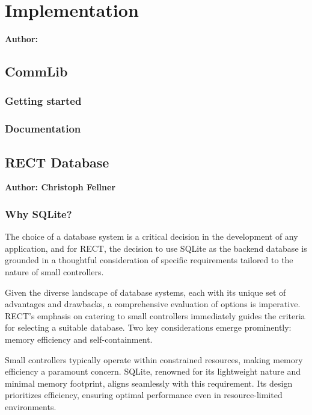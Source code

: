\chapter{Implementation}

\textbf{Author: } 

\section{CommLib}
\subsection{Getting started}



\subsection{Documentation}

\section{RECT Database}
\textbf{Author: Christoph Fellner}

\subsection{Why SQLite?}
The choice of a database system is a critical decision in the development of any application, and for RECT, the decision to use SQLite as the backend database 
is grounded in a thoughtful consideration of specific requirements tailored to the nature of small controllers.\newline

Given the diverse landscape of database systems, each with its unique set of advantages and drawbacks, a comprehensive evaluation of options is imperative. 
RECT's emphasis on catering to small controllers immediately guides the criteria for selecting a suitable database. Two key considerations emerge prominently: 
memory efficiency and self-containment.\newline

Small controllers typically operate within constrained resources, making memory efficiency a paramount concern. SQLite, renowned for its lightweight nature and 
minimal memory footprint, aligns seamlessly with this requirement. Its design prioritizes efficiency, ensuring optimal performance even in resource-limited 
environments.\newline

